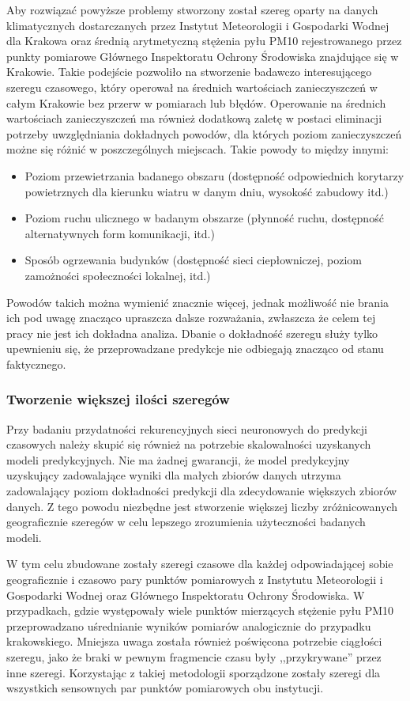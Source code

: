 \documentclass[10pt,a4paper]{article}
\begin{document}
Aby rozwiązać powyższe problemy stworzony został szereg oparty na danych klimatycznych dostarczanych przez Instytut Meteorologii i Gospodarki Wodnej dla Krakowa oraz średnią arytmetyczną stężenia pyłu PM10 rejestrowanego przez punkty pomiarowe Głównego Inspektoratu Ochrony Środowiska znajdujące się w Krakowie. Takie podejście pozwoliło na stworzenie badawczo interesującego szeregu czasowego, który operował na średnich wartościach zanieczyszczeń w całym Krakowie bez przerw w pomiarach lub błędów. 
Operowanie na średnich wartościach zanieczyszczeń ma również dodatkową zaletę w postaci eliminacji potrzeby uwzględniania dokładnych powodów, dla których poziom zanieczyszczeń możne się różnić w poszczególnych miejscach. Takie powody to między innymi: 
\begin{itemize}
	\item Poziom przewietrzania badanego obszaru (dostępność odpowiednich korytarzy powietrznych dla kierunku wiatru w danym dniu, wysokość zabudowy itd.)
	\item Poziom ruchu ulicznego w badanym obszarze (płynność ruchu, dostępność alternatywnych form komunikacji, itd.)
	\item Sposób ogrzewania budynków (dostępność sieci ciepłowniczej, poziom zamożności społeczności lokalnej, itd.)
\end{itemize}
Powodów takich można wymienić znacznie więcej, jednak możliwość nie brania ich pod uwagę znacząco upraszcza dalsze rozważania, zwłaszcza że celem tej pracy nie jest ich dokładna analiza. Dbanie o dokładność szeregu służy tylko upewnieniu się, że przeprowadzane predykcje nie odbiegają znacząco od stanu faktycznego. 
\newpage

\subsubsection{Tworzenie większej ilości szeregów}
Przy badaniu przydatności rekurencyjnych sieci neuronowych do predykcji czasowych należy skupić się również na potrzebie skalowalności uzyskanych modeli predykcyjnych. Nie ma żadnej gwarancji, że model predykcyjny uzyskujący zadowalające wyniki dla małych zbiorów danych utrzyma zadowalający poziom dokładności predykcji dla zdecydowanie większych zbiorów danych. Z tego powodu niezbędne jest stworzenie większej liczby zróżnicowanych geograficznie szeregów w celu lepszego zrozumienia użyteczności badanych modeli. 

W tym celu zbudowane zostały szeregi czasowe dla każdej odpowiadającej sobie geograficznie i czasowo pary punktów pomiarowych z Instytutu Meteorologii i Gospodarki Wodnej oraz Głównego Inspektoratu Ochrony Środowiska. W przypadkach, gdzie występowały wiele punktów mierzących stężenie pyłu PM10 przeprowadzano uśrednianie wyników pomiarów analogicznie do przypadku krakowskiego. Mniejsza uwaga została również poświęcona potrzebie ciągłości szeregu, jako że braki w pewnym fragmencie czasu były ,,przykrywane'' przez inne szeregi. Korzystając z takiej metodologii sporządzone zostały szeregi dla wszystkich sensownych par punktów pomiarowych obu instytucji.
\end{document}
